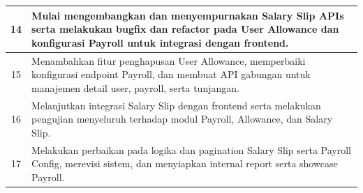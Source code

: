 \begin{center}
\begin{longtable}{|c|p{}|}
\hline
14 &  Mulai mengembangkan dan menyempurnakan Salary Slip APIs serta melakukan bugfix dan refactor pada User Allowance dan konfigurasi Payroll untuk integrasi dengan frontend.\\
\hline
15 &  Menambahkan fitur penghapusan User Allowance, memperbaiki konfigurasi endpoint Payroll, dan membuat API gabungan untuk manajemen detail user, payroll, serta tunjangan.\\
\hline
16 &  Melanjutkan integrasi Salary Slip dengan frontend serta melakukan pengujian menyeluruh terhadap modul Payroll, Allowance, dan Salary Slip.\\
\hline
17 &  Melakukan perbaikan pada logika dan pagination Salary Slip serta Payroll Config, merevisi sistem, dan menyiapkan internal report serta showcase Payroll.\\
\hline

\end{longtable}
\end{center}

